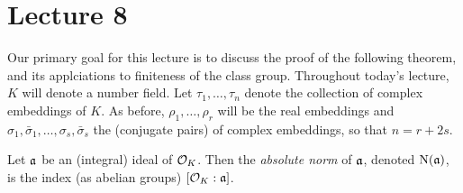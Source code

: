 \section{Lecture 8}

Our primary goal for this lecture is to discuss the proof of the following theorem, and its applciations to finiteness of the class group.
Throughout today's lecture, $K$ will denote a number field.
Let $\tau_{1},\ldots,\tau_{n}$ denote the collection of complex embeddings of $K$.
As before, $\rho_{1},\ldots,\rho_{r}$ will be the real embeddings and $\sigma_{1},\bar\sigma_{1},\ldots,\sigma_{s},\bar\sigma_{s}$ the (conjugate pairs) of complex embeddings, so that $n = r + 2s$.

\begin{definition}
  Let $\mathfrak{a}$ be an (integral) ideal of $\mathcal{O}_{K}$.
  Then the \emph{absolute norm} of $\mathfrak{a}$, denoted $\operatorname{N}(\mathfrak{a})$, is the index (as abelian groups) $[\mathcal{O}_{K}:\mathfrak{a}]$.
\end{definition}

